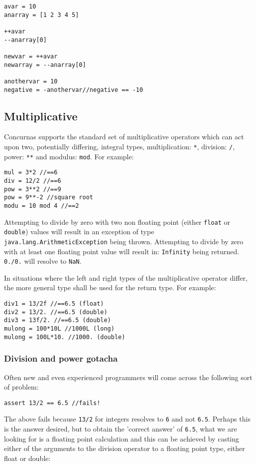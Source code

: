 \documentclass[conc-doc]{subfiles}
\begin{document}
\begin{lstlisting}
avar = 10
anarray = [1 2 3 4 5]

++avar
--anarray[0]

newvar = ++avar
newarray = --anarray[0]

anothervar = 10
negative = -anothervar//negative == -10
\end{lstlisting}

\subsection{Multiplicative}
Concurnas supports the standard set of multiplicative operators which can act upon two, potentially differing, integral types, multiplication: \lstinline{*}, division: \lstinline{/}, power: \lstinline{**} and modulus: \lstinline{mod}. For example:

\begin{lstlisting}
mul = 3*2 //==6
div = 12/2 //==6
pow = 3**2 //==9
pow = 9**-2 //square root
modu = 10 mod 4 //==2
\end{lstlisting}

Attempting to divide by zero with two non floating point (either \lstinline{float} or \lstinline{double}) values will result in an exception of type \lstinline{java.lang.ArithmeticException} being thrown. Attempting to divide by zero with at least one floating point value will result in: \lstinline{Infinity} being returned. \lstinline{0./0.} will resolve to \lstinline{NaN}.

In situations where the left and right types of the multiplicative operator differ, the more general type shall be used for the return type. For example:

\begin{lstlisting}
div1 = 13/2f //==6.5 (float)
div2 = 13/2. //==6.5 (double)
div3 = 13f/2. //==6.5 (double)
mulong = 100*10L //1000L (long)
mulong = 100L*10. //1000. (double)
\end{lstlisting}

\subsubsection{Division and power gotacha}
Often new and even experienced programmers will come across the following sort of problem:
\begin{lstlisting}
assert 13/2 == 6.5 //fails!
\end{lstlisting}

The above fails because \lstinline{13/2} for integers resolves to \lstinline{6} and not \lstinline{6.5}. Perhaps this is the answer desired, but to obtain the 'correct answer' of \lstinline{6.5}, what we are looking for is a floating point calculation and this can be achieved by casting either of the arguments to the division operator to a floating point type, either float or double:
\end{document}
